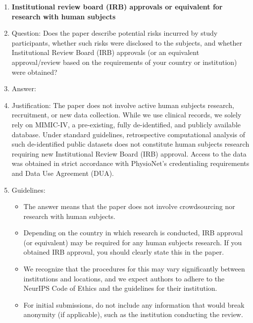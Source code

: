 \documentclass{article}
\theoremstyle{plain}
\theoremstyle{definition}
\theoremstyle{remark}
\begin{document}
\begin{enumerate}
\item {\bf Institutional review board (IRB) approvals or equivalent for research with human subjects}
    \item[] Question: Does the paper describe potential risks incurred by study participants, whether such risks were disclosed to the subjects, and whether Institutional Review Board (IRB) approvals (or an equivalent approval/review based on the requirements of your country or institution) were obtained?
    \item[] Answer: \answerNA{}
    \item[] Justification: The paper does not involve active human subjects research, recruitment, or new data collection. While we use clinical records, we solely rely on MIMIC-IV, a pre-existing, fully de-identified, and publicly available database. Under standard guidelines, retrospective computational analysis of such de-identified public datasets does not constitute human subjects research requiring new Institutional Review Board (IRB) approval. Access to the data was obtained in strict accordance with PhysioNet's credentialing requirements and Data Use Agreement (DUA).
    \item[] Guidelines:
    \begin{itemize}
        \item The answer \answerNA{} means that the paper does not involve crowdsourcing nor research with human subjects.
        \item Depending on the country in which research is conducted, IRB approval (or equivalent) may be required for any human subjects research. If you obtained IRB approval, you should clearly state this in the paper. 
        \item We recognize that the procedures for this may vary significantly between institutions and locations, and we expect authors to adhere to the NeurIPS Code of Ethics and the guidelines for their institution. 
        \item For initial submissions, do not include any information that would break anonymity (if applicable), such as the institution conducting the review.
    \end{itemize}
    

\end{enumerate}
\end{document}

